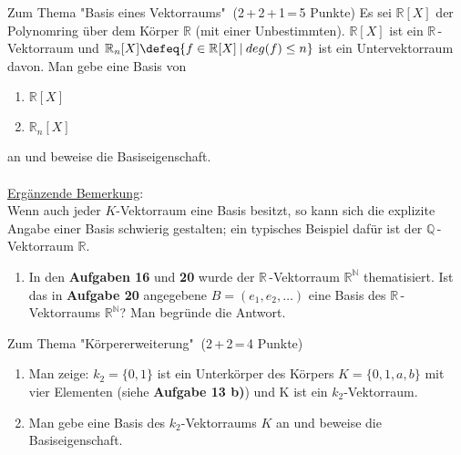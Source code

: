 \documentclass{uebblatt}
\begin{document}

\begin{aufgabe}{Zum Thema "Basis eines Vektorraums" $\>$(2\,+\,2\,+\,1\,=\,5 Punkte)}
Es sei $\mathbb{R}[X]$ der Polynomring über dem Körper $\mathbb{R}$ (mit einer Unbestimmten). $\mathbb{R}[X]$ ist ein $\mathbb{R}$\,-Vektorraum und $\mathbb{R}_n[X] \defeq \{f \in \mathbb{R}[X] \> | \> deg(f) \le n\}$ ist ein Untervektorraum davon. Man gebe eine Basis von
\begin{enumerate}
\item $\mathbb{R}[X]$
\item $\mathbb{R}_n[X]$
\end{enumerate}
an und beweise die Basiseigenschaft.\\ \\
\underline{Ergänzende Bemerkung}:  \vspace{1,5mm}\\
Wenn auch jeder $K$-Vektorraum eine Basis besitzt, so kann sich die explizite Angabe einer Basis schwierig gestalten; ein typisches Beispiel dafür ist der $\mathbb{Q}$\,-Vektorraum $\mathbb{R}$. 
\begin{enumerate}[resume]
\item In den \textbf{Aufgaben 16} und \textbf{20} wurde der $\mathbb{R}$\,-Vektorraum $\mathbb{R}^\mathbb{N}$ thematisiert. Ist das in \textbf{Aufgabe 20} angegebene $B = (e_1, e_2, …)$ eine Basis des $\mathbb{R}$\,-Vektorraums $\mathbb{R}^\mathbb{N}$? Man begründe die Antwort.
\end{enumerate}
\end{aufgabe}


\begin{aufgabe}{Zum Thema "Körpererweiterung" $\>$(2\,+\,2\,=\,4 Punkte)}
\begin{enumerate}
\item Man zeige: $k_2 = \{0, 1\}$ ist ein Unterkörper des Körpers $K = \{0, 1, a, b\}$ mit vier Elementen (siehe \textbf{Aufgabe 13 b)}) und K ist ein $k_2$-Vektorraum.
\item Man gebe eine Basis des $k_2$-Vektorraums $K$ an und beweise die Basiseigenschaft.
\end{enumerate}
\end{aufgabe}
\end{document}
